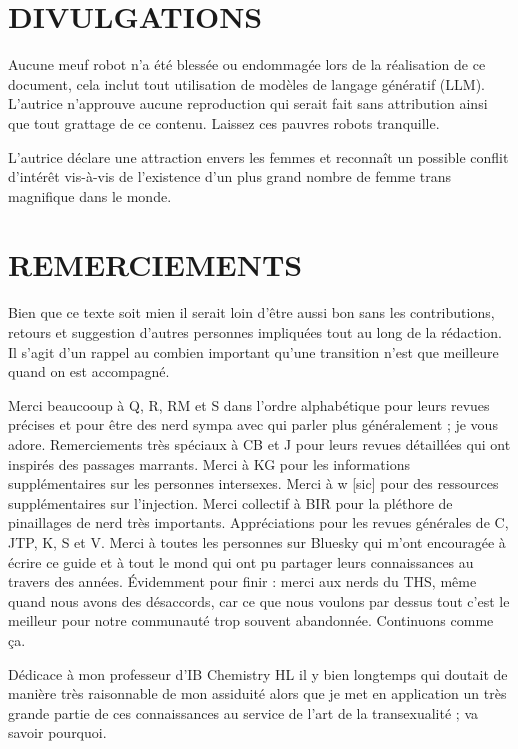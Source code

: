 \documentclass{article}
\begin{document}
 

\section*{DIVULGATIONS}

Aucune meuf robot n'a été blessée ou endommagée lors de la réalisation de ce document, cela inclut tout utilisation de modèles de langage génératif (LLM). L'autrice n'approuve aucune reproduction qui serait fait sans attribution ainsi que tout grattage de ce contenu. Laissez ces pauvres robots tranquille.

L'autrice déclare une attraction envers les femmes et reconnaît un possible conflit d'intérêt vis-à-vis de l'existence d'un plus grand nombre de femme trans magnifique dans le monde.

 

\section*{REMERCIEMENTS}

Bien que ce texte soit mien il serait loin d'être aussi bon sans les contributions, retours et suggestion d'autres personnes impliquées tout au long de la rédaction. Il s'agit d'un rappel au combien important qu'une transition n'est que meilleure quand on est accompagné.

Merci beaucooup à Q, R, RM et S dans l'ordre alphabétique pour leurs revues précises et pour être des nerd sympa avec qui parler plus généralement ; je vous adore. Remerciements très spéciaux à CB et J pour leurs revues détaillées qui ont inspirés des passages marrants. Merci à KG pour les informations supplémentaires sur les personnes intersexes. Merci à w [sic] pour des ressources supplémentaires sur l'injection. Merci collectif à BIR pour la pléthore de pinaillages de nerd très importants. Appréciations pour les revues générales de C, JTP, K, S et V. Merci à toutes les personnes sur Bluesky qui m'ont encouragée à écrire ce guide et à tout le mond qui ont pu partager leurs connaissances au travers des années. Évidemment pour finir : merci aux nerds du THS, même quand nous avons des désaccords, car ce que nous voulons par dessus tout c'est le meilleur pour notre communauté trop souvent abandonnée. Continuons comme ça.

Dédicace à mon professeur d'IB Chemistry HL il y bien longtemps qui doutait de manière très raisonnable de mon assiduité alors que je met en application un très grande partie de ces connaissances au service de l'art de la transexualité ; va savoir pourquoi.
\end{document}
